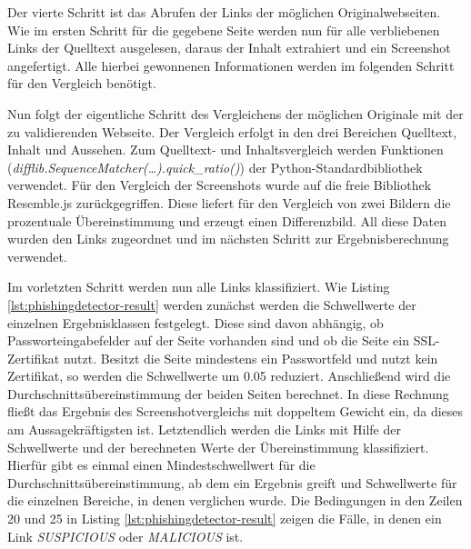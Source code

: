 Der vierte Schritt ist das Abrufen der Links der möglichen Originalwebseiten. Wie im ersten Schritt
für die gegebene Seite werden nun für alle verbliebenen Links der Quelltext ausgelesen, daraus
der Inhalt extrahiert und ein Screenshot angefertigt. Alle hierbei gewonnenen Informationen werden
im folgenden Schritt für den Vergleich benötigt.

Nun folgt der eigentliche Schritt des Vergleichens der möglichen Originale mit der zu validierenden Webseite. Der Vergleich erfolgt in den drei Bereichen Quelltext, Inhalt und Aussehen. Zum Quelltext- und Inhaltsvergleich werden Funktionen (\textit{difflib.SequenceMatcher(\ldots).quick\_ratio()}) der Python-Standardbibliothek verwendet. Für den Vergleich der Screenshots wurde auf die freie Bibliothek Resemble.js zurückgegriffen. Diese liefert für den Vergleich von zwei Bildern die prozentuale Übereinstimmung und erzeugt einen Differenzbild. All diese Daten wurden den Links zugeordnet und im nächsten Schritt zur Ergebnisberechnung verwendet.

Im vorletzten Schritt werden nun alle Links klassifiziert. Wie Listing \ref{lst:phishingdetector-result} werden zunächst werden die Schwellwerte der einzelnen Ergebnisklassen festgelegt. Diese sind davon abhängig, ob Passworteingabefelder auf der Seite vorhanden sind und ob die Seite ein \acs{SSL}-Zertifikat nutzt. Besitzt die Seite mindestens ein Passwortfeld und nutzt kein Zertifikat, so werden die Schwellwerte um 0.05 reduziert. Anschließend wird die Durchschnittsübereinstimmung der beiden Seiten berechnet. In diese Rechnung fließt das Ergebnis des Screenshotvergleichs mit doppeltem Gewicht ein, da dieses am Aussagekräftigsten ist. Letztendlich werden die Links mit Hilfe der Schwellwerte und der berechneten Werte der Übereinstimmung klassifiziert. Hierfür gibt es einmal einen Mindestschwellwert für die Durchschnittsübereinstimmung, ab dem ein Ergebnis greift und Schwellwerte für die einzelnen Bereiche, in denen verglichen wurde. Die Bedingungen in den Zeilen 20 und 25 in Listing \ref{lst:phishingdetector-result} zeigen die Fälle, in denen ein Link \textit{SUSPICIOUS} oder \textit{MALICIOUS} ist.


